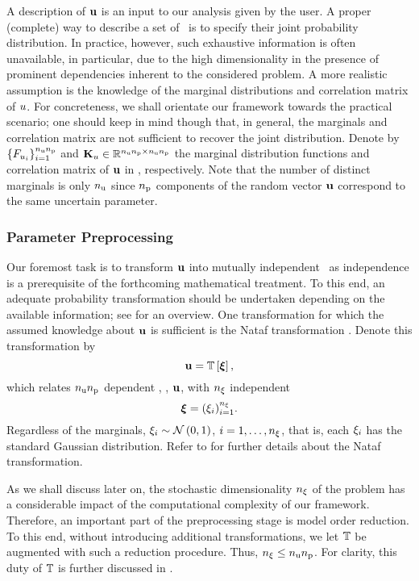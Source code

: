 A description of $\mathbf{u}$ is an input to our analysis given by the user.
A proper (complete) way to describe a set of \rvs\ is to specify their joint probability distribution.
In practice, however, such exhaustive information is often unavailable, in particular, due to the high dimensionality in the presence of prominent dependencies inherent to the considered problem.
A more realistic assumption is the knowledge of the marginal distributions and correlation matrix of $u$.
For concreteness, we shall orientate our framework towards the practical scenario; one should keep in mind though that, in general, the marginals and correlation matrix are not sufficient to recover the joint distribution.
Denote by $\{ F_{u_i} \}_{i = 1}^{{n_\text{u}} {n_\text{p}}}$ and $\mathbf{K}_u \in \mathbb{R}^{{n_\text{u}} {n_\text{p}} \times {n_\text{u}} {n_\text{p}}}$ the marginal distribution functions and correlation matrix of $\mathbf{u}$ in , respectively.
Note that the number of distinct marginals is only ${n_\text{u}}$ since ${n_\text{p}}$ components of the random vector $\mathbf{u}$ correspond to the same uncertain parameter.

\subsubsection{Parameter Preprocessing} 
Our foremost task is to transform $\mathbf{u}$ into mutually independent \rvs\ as independence is a prerequisite of the forthcoming mathematical treatment.
To this end, an adequate probability transformation should be undertaken depending on the available information; see \cite{eldred2008} for an overview.
One transformation for which the assumed knowledge about $\mathbf{u}$ is sufficient is the Nataf transformation \cite{li2008}.
Denote this transformation by
\begin{equation} \elab{probability-transformation}
  \vu = \transformation{\vz},
\end{equation}
which relates ${n_\text{u}} {n_\text{p}}$ dependent \rvs, \ie, $\mathbf{u}$, with ${n_\xi}$ independent \rvs
\begin{equation} \elab{independent-random-variables}
  \vz = (\z_i)_{i = 1}^\nvars.
\end{equation}
Regardless of the marginals, $\xi_i \sim \mathcal{N}\left( 0, 1 \right)$, $i = 1, \dots, {n_\xi}$, that is, each $\xi_i$ has the standard Gaussian distribution.
Refer to  for further details about the Nataf transformation.

As we shall discuss later on, the stochastic dimensionality ${n_\xi}$ of the problem has a considerable impact of the computational complexity of our framework.
Therefore, an important part of the preprocessing stage is model order reduction.
To this end, without introducing additional transformations, we let $\transformation$ be augmented with such a reduction procedure.
Thus, ${n_\xi} \leq {n_\text{u}} {n_\text{p}}$.
For clarity, this duty of $\transformation$ is further discussed in .

